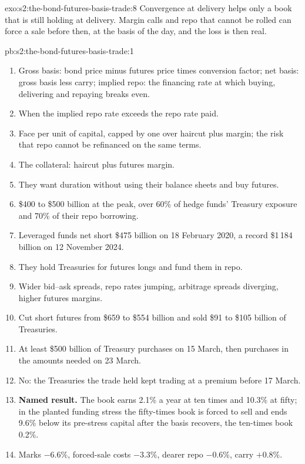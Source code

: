 \begin{solution}{exo:s2:the-bond-futures-basis-trade:8}
Convergence at delivery helps only a book that is still holding at delivery. Margin calls and repo that cannot be rolled can force a sale before
then, at the basis of the day, and the loss is then real.
\end{solution}

\begin{solution}{pb:s2:the-bond-futures-basis-trade:1}
\begin{enumerate}
\item Gross basis: bond price minus futures price times conversion factor; net basis: gross basis less carry; implied repo: the financing rate at which
buying, delivering and repaying breaks even.
\item When the implied repo rate exceeds the repo rate paid.
\item Face per unit of capital, capped by one over haircut plus margin; the risk that repo cannot be refinanced on the same terms.
\item The collateral: haircut plus futures margin.
\item They want duration without using their balance sheets and buy futures.
\item \$400 to \$500 billion at the peak, over 60\% of hedge funds' Treasury exposure and 70\% of their repo borrowing.
\item Leveraged funds net short \$475 billion on 18 February 2020, a record \$1\,184 billion on 12 November 2024.
\item They hold Treasuries for futures longs and fund them in repo.
\item Wider bid--ask spreads, repo rates jumping, arbitrage spreads diverging, higher futures margins.
\item Cut short futures from \$659 to \$554 billion and sold \$91 to \$105 billion of Treasuries.
\item At least \$500 billion of Treasury purchases on 15 March, then purchases in the amounts needed on 23 March.
\item No: the Treasuries the trade held kept trading at a premium before 17 March.
\item \textbf{Named result.} The book earns 2.1\% a year at ten times and 10.3\% at fifty; in the planted funding stress the fifty-times book is forced
to sell and ends 9.6\% below its pre-stress capital after the basis recovers, the ten-times book 0.2\%.
\item Marks $-6.6\%$, forced-sale costs $-3.3\%$, dearer repo $-0.6\%$, carry $+0.8\%$.

\end{enumerate}
\end{solution}
